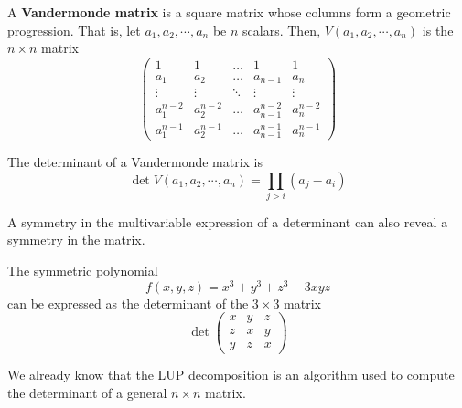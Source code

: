   \begin{definition}
    \label{def:vandermonde-matrix}
    A \textbf{Vandermonde matrix} is a square matrix whose columns form a geometric progression. That is, let $a_1, a_2, \cdots, a_n$ be $n$ scalars. Then, $V(a_1, a_2, \cdots, a_n)$ is the $n \times n$ matrix
    \begin{equation}
      \begin{pmatrix}
        1&1&\ldots&1&1 \\
        a_1&a_2&\ldots&a_{n-1}&a_n\\
        \vdots&\vdots&\ddots&\vdots&\vdots\\
        a_1^{n-2}&a_2^{n-2}&\ldots&a_{n-1}^{n-2}&a_n^{n-2}\\
        a_1^{n-1}&a_2^{n-1}&\ldots&a_{n-1}^{n-1}&a_n^{n-1}
      \end{pmatrix}
    \end{equation}
  \end{definition}

  \begin{theorem}
    \label{thm:determinant-of-a-vandermonde-matrix}
    The determinant of a Vandermonde matrix is
    \begin{equation}
      \det{V(a_1, a_2, \cdots, a_n)} = \prod_{j>i} (a_j - a_i)
    \end{equation}
  \end{theorem}

  A symmetry in the multivariable expression of a determinant can also reveal a symmetry in the matrix.

  \begin{example}[2019 Putnam A1]
    \label{ex:2019-putnam-a1}
    The symmetric polynomial 
    \begin{equation}
       f(x, y, z) = x^3 + y^3 + z^3 - 3 x y z
    \end{equation}
    can be expressed as the determinant of the $3 \times 3$ matrix
    \begin{equation}
      \det{\begin{pmatrix}
      x&y&z\\
      z&x&y\\
      y&z&x
      \end{pmatrix}}
    \end{equation}
  \end{example}


  We already know that the LUP decomposition is an algorithm used to compute the determinant of a general $n \times n$ matrix. 

